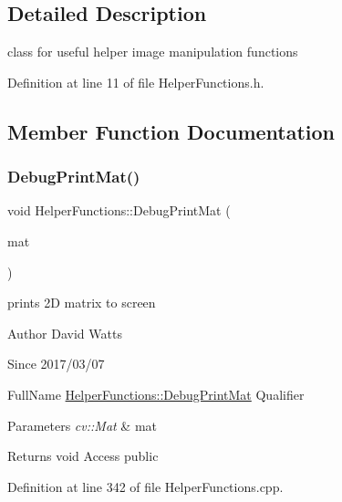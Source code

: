 \subsection{Detailed Description}
class for useful helper image manipulation functions 

Definition at line 11 of file Helper\+Functions.\+h.



\subsection{Member Function Documentation}
\mbox{\label{class_helper_functions_a375b456c83eb7d8b7746a700e1ec38d1}} 
\subsubsection{\texorpdfstring{Debug\+Print\+Mat()}{DebugPrintMat()}}
{\footnotesize\ttfamily void Helper\+Functions\+::\+Debug\+Print\+Mat (\begin{DoxyParamCaption}\item[{cv\+::\+Mat}]{mat }\end{DoxyParamCaption})\hspace{0.3cm}{\ttfamily [static]}}

prints 2D matrix to screen

\begin{DoxyAuthor}{Author}
David Watts 
\end{DoxyAuthor}
\begin{DoxySince}{Since}
2017/03/07
\end{DoxySince}
Full\+Name \hyperlink{class_helper_functions_a375b456c83eb7d8b7746a700e1ec38d1}{Helper\+Functions\+::\+Debug\+Print\+Mat} Qualifier 
\begin{DoxyParams}{Parameters}
{\em cv\+::\+Mat} & mat \\
\hline
\end{DoxyParams}
\begin{DoxyReturn}{Returns}
void Access public 
\end{DoxyReturn}


Definition at line 342 of file Helper\+Functions.\+cpp.

\mbox{\label{class_helper_functions_a5c5283b1bdbfff78c4381a93161effe5}} 
